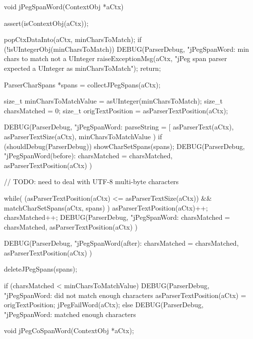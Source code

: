 \startCCode
void jPegSpanWord(ContextObj *aCtx) {
  assert(isContextObj(aCtx));

  popCtxDataInto(aCtx, minCharsToMatch);
  if (!isUIntegerObj(minCharsToMatch)) {
    DEBUG(ParserDebug,
      "jPegSpanWord: min chars to match not a UInteger%
    raiseExceptionMsg(aCtx,
      "jPeg span parser expected a UInteger as minCharsToMatch");
    return;
  }
  
  ParserCharSpans *spans = collectJPegSpans(aCtx);
  
  size_t minCharsToMatchValue = asUInteger(minCharsToMatch);
  size_t charsMatched         = 0;
  size_t origTextPosition = asParserTextPosition(aCtx);
  
  DEBUG(ParserDebug,
    "jPegSpanWord: parseString = [%
    asParserText(aCtx), asParserTextSize(aCtx), minCharsToMatchValue
  )
  if (shouldDebug(ParserDebug)) showCharSetSpans(spans);
  DEBUG(ParserDebug,
    "jPegSpanWord(before): charsMatched = %
    charsMatched, asParserTextPosition(aCtx)
  )
 
 // TODO: need to deal with UTF-8 multi-byte characters
  
  while(
    (asParserTextPosition(aCtx) <= asParserTextSize(aCtx)) &&
    matchCharSetSpans(aCtx, spans)
  ) {
    asParserTextPosition(aCtx)++;
    charsMatched++;
    DEBUG(ParserDebug,
      "jPegSpanWord: charsMatched = %
      charsMatched, asParserTextPosition(aCtx)
    )
  }

  DEBUG(ParserDebug,
    "jPegSpanWord(after): charsMatched = %
    charsMatched, asParserTextPosition(aCtx)
  )

  deleteJPegSpans(spans);
 
  if (charsMatched < minCharsToMatchValue) {
    DEBUG(ParserDebug,
      "jPegSpanWord: did not match enough characters%
    asParserTextPosition(aCtx) = origTextPosition;
    jPegFailWord(aCtx);
  } else {
    DEBUG(ParserDebug,
      "jPegSpanWord: matched enough characters%
  }
}
\stopCCode

\startCHeader
void jPegCoSpanWord(ContextObj *aCtx);
\stopCHeader


